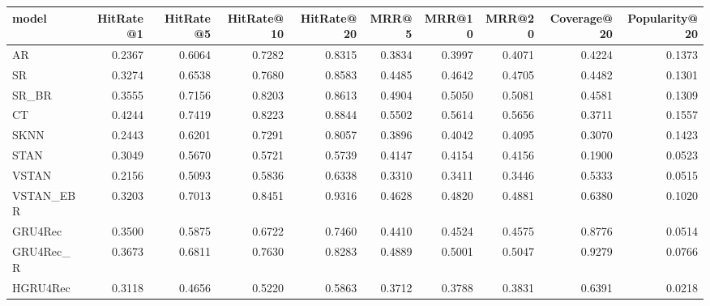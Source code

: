 \begin{tabular}{lrrrrrrrrr}
\toprule
     model &  HitRate@1 &  HitRate@5 &  HitRate@10 &  HitRate@20 &   MRR@5 &  MRR@10 &  MRR@20 &  Coverage@20 &  Popularity@20 \\
\midrule
        AR &     0.2367 &     0.6064 &      0.7282 &      0.8315 &  0.3834 &  0.3997 &  0.4071 &       0.4224 &         0.1373 \\
        SR &     0.3274 &     0.6538 &      0.7680 &      0.8583 &  0.4485 &  0.4642 &  0.4705 &       0.4482 &         0.1301 \\
     SR\_BR &     0.3555 &     0.7156 &      0.8203 &      0.8613 &  0.4904 &  0.5050 &  0.5081 &       0.4581 &         0.1309 \\
        CT &     0.4244 &     0.7419 &      0.8223 &      0.8844 &  0.5502 &  0.5614 &  0.5656 &       0.3711 &         0.1557 \\
      SKNN &     0.2443 &     0.6201 &      0.7291 &      0.8057 &  0.3896 &  0.4042 &  0.4095 &       0.3070 &         0.1423 \\
      STAN &     0.3049 &     0.5670 &      0.5721 &      0.5739 &  0.4147 &  0.4154 &  0.4156 &       0.1900 &         0.0523 \\
     VSTAN &     0.2156 &     0.5093 &      0.5836 &      0.6338 &  0.3310 &  0.3411 &  0.3446 &       0.5333 &         0.0515 \\
 VSTAN\_EBR &     0.3203 &     0.7013 &      0.8451 &      0.9316 &  0.4628 &  0.4820 &  0.4881 &       0.6380 &         0.1020 \\
   GRU4Rec &     0.3500 &     0.5875 &      0.6722 &      0.7460 &  0.4410 &  0.4524 &  0.4575 &       0.8776 &         0.0514 \\
 GRU4Rec\_R &     0.3673 &     0.6811 &      0.7630 &      0.8283 &  0.4889 &  0.5001 &  0.5047 &       0.9279 &         0.0766 \\
  HGRU4Rec &     0.3118 &     0.4656 &      0.5220 &      0.5863 &  0.3712 &  0.3788 &  0.3831 &       0.6391 &         0.0218 \\
\bottomrule
\end{tabular}

